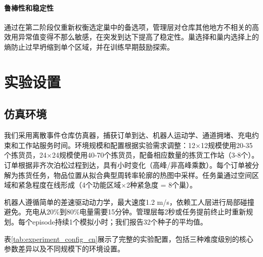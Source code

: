 \documentclass[12pt,a4paper]{article}
\begin{document}
\paragraph{鲁棒性和稳定性}

通过在第二阶段仅重新权衡选定巢中的备选项，管理层对仓库其他地方不相关的高效用异常值变得不那么敏感，在突发到达下提高了稳定性。巢选择和巢内选择上的熵防止过早坍缩到单个区域，并在训练早期鼓励探索。

\section{实验设置}

\subsection{仿真环境}

我们采用离散事件仓库仿真器，捕获订单到达、机器人运动学、通道拥堵、充电约束和工作站服务时间。环境规模和配置根据实验需求调整：12$\times$12规模使用20-35个拣货员，24$\times$24规模使用40-70个拣货员，配备相应数量的拣货工作站（3-8个）。订单根据非齐次泊松过程到达，具有小时变化（高峰/非高峰乘数）。每个订单被分解为拣货任务，物品位置从拟合典型周转率轮廓的热图中采样。任务巢通过空间区域和紧急程度在线形成（4个功能区域$\times$2种紧急度 = 8个巢）。

机器人遵循简单的差速驱动动力学，最大速度1.2 m/s，依赖工人层进行局部碰撞避免。充电从20\%到80\%电量需要15分钟。管理层每2秒或任务提前终止时重新规划。每个episode持续1个模拟小时；我们报告32个种子的平均值。

表\ref{tab:experiment_config_cn}展示了完整的实验配置，包括三种难度级别的核心参数差异以及不同规模下的环境设置。
\end{document}
